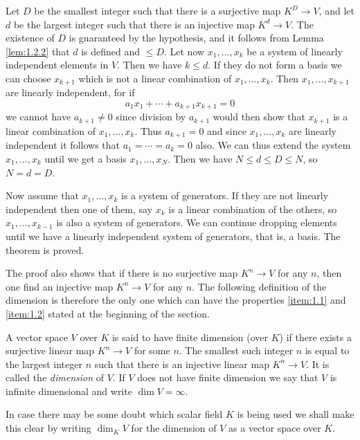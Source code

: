 \begin{prf}
  Let $D$ be the smallest integer such that there is a surjective map
  $K^D\to V$, and let $d$ be the largest integer such that there is an
  injective map $K^d\to V$. The existence of $D$ is guaranteed by the
  hypothesis, and it follows from Lemma \ref{lem:1.2.2} that $d$ is
  defined and $\leq D$. Let now $x_1,\dots,x_k$ be a system of
  linearly independent elements in $V$. Then we have $k\leq d$. If
  they do not form a basis we can choose $x_{k+1}$ which is not a
  linear combination of $x_1,\dots,x_k$. Then $x_1,\dots,x_{k+1}$ are
  linearly independent, for if
  \begin{displaymath}
    a_1x_1+\cdots+a_{k+1}x_{k+1}=0
  \end{displaymath}
we cannot have $a_{k+1}\neq 0$ since division by $a_{k+1}$ would then
show that $x_{k+1}$ is a linear combination of $x_1,\dots,x_k$. Thus
$a_{k+1}=0$ and since $x_1,\dots,x_k$ are linearly independent it
follows that $a_1=\cdots=a_k=0$ also. We can thus extend the system
$x_1,\dots,x_k$ until we get a basis $x_1,\dots,x_N$. Then we have
$N\leq d\leq D\leq N$, so $N=d=D$.\par
Now assume that $x_1,\dots,x_k$ is a system of generators. If they are
not linearly independent then one of them, say $x_k$ is a linear
combination of the others, so $x_1,\dots,x_{k-1}$ is also a system of
generators. We can continue dropping elements until we have a linearly
independent system of generators, that is, a basis. The theorem is proved.
\end{prf}
The proof also shows that if there is no surjective map $K^n\to V$ for
any $n$, then one find an injective map $K^n\to V$ for any $n$. The
following definition of the dimension is therefore the only one which
can have the properties \ref{item:1.1} and \ref{item:1.2} stated at the
beginning of the section.
\begin{dfn}
  A vector space $V$ over $K$ is said to have finite dimension (over
  $K$) if there exists a surjective linear map $K^n\to V$ for some
  $n$. The smallest such integer $n$ is equal to the largest integer
  $n$ such that there is an injective linear map $K^n\to V$. It is
  called the \emph{dimension} of $V$. If $V$ does not have finite
  dimension we say that $V$ is infinite dimensional and write $\dim
  V=\infty$.
\end{dfn}
\begin{rem}
  In case there may be some doubt which scalar field $K$ is being used
  we shall make this clear by writing $\dim_KV$ for the dimension of
  $V$ as a vector space over $K$.
\end{rem}
